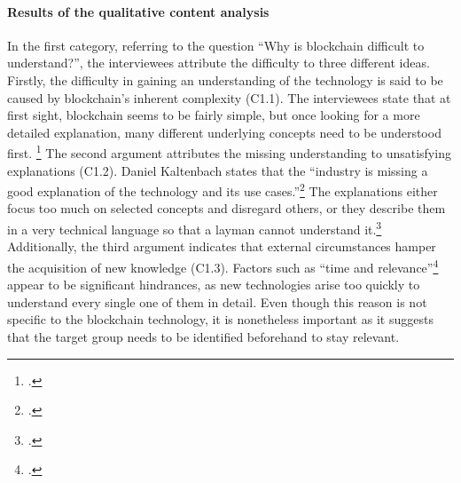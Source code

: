 \paragraph{Results of the qualitative content analysis} In the first category, referring to the question \enquote{Why is blockchain difficult to understand?}, the interviewees attribute the difficulty to three different ideas. Firstly, the difficulty in gaining an understanding of the technology is said to be caused by blockchain's inherent complexity (C1.1). The interviewees state that at first sight, blockchain seems to be fairly simple, but once looking for a more detailed explanation, many different underlying concepts need to be understood first. \footcites[Cf.][P73, P74, P75]{DanielKaltenbach_Interview}[cf.][P113]{RalphBeckmann_Interview} The second argument attributes the missing understanding to unsatisfying explanations (C1.2). Daniel Kaltenbach states that the \enquote{industry is missing a good explanation of the technology and its use cases.}\footcite[][P5]{DanielKaltenbach_Interview} The explanations either focus too much on selected concepts and disregard others, or they describe them in a very technical language so that a layman cannot understand it.\footcites[Cf.][P7, P8, P19, P20 ]{DanielKaltenbach_Interview}[cf.][P131]{RalphBeckmann_Interview} Additionally, the third argument indicates that external circumstances hamper the acquisition of new knowledge (C1.3). Factors such as \enquote{time and relevance}\footcite[][P9]{DanielKaltenbach_Interview} appear to be significant hindrances, as new technologies arise too quickly to understand every single one of them in detail. Even though this reason is not specific to the blockchain technology, it is nonetheless important as it suggests that the target group needs to be identified beforehand to stay relevant.

